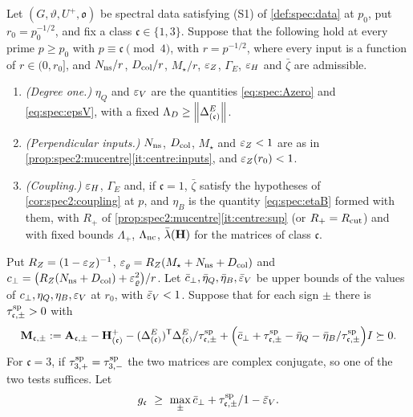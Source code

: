 \begin{theorem}\label{thm:spectral-criterion}
Let $(G,\vartheta,U^+,\mathfrak o)$ be spectral data satisfying
\textup{(S1)} of \cref{def:spec:data} at $p_0$,
put $r_0=p_0^{-1/2}$, and fix a class $\mathfrak c\in\{1,3\}$. Suppose that the
following hold at every prime $p\ge p_0$ with $p\equiv\mathfrak c\pmod4$, with
$r=p^{-1/2}$, where every input is a function of $r\in(0,r_0]$, and
$N_{\rm ns}/r$, $D_{\rm col}/r$, $M_\star/r$, $\varepsilon_Z$, $\Gamma_E$, $\varepsilon_H$ and $\bar\zeta$ are
admissible.
\begin{enumerate}[label=\textup{(R\arabic*)}]
\item \emph{(Degree one.)} $\eta_Q$ and $\varepsilon_V$ are the quantities \eqref{eq:spec:Azero}
  and \eqref{eq:spec:epsV}, with a fixed $\Lambda_D\ge\left\|\Delta^E_{(\mathfrak c)}\right\|$.
\item \emph{(Perpendicular inputs.)} $N_{\rm ns}$, $D_{\rm col}$, $M_\star$ and $\varepsilon_Z<1$ are
  as in \cref{prop:spec2:mucentre}\ref{it:centre:inputs}, and $\varepsilon_Z(r_0)<1$.
\item \emph{(Coupling.)} $\varepsilon_H$, $\Gamma_E$ and, if $\mathfrak c=1$, $\bar\zeta$ satisfy
  the hypotheses of \cref{cor:spec2:coupling} at $p$, and $\eta_B$ is the quantity
  \eqref{eq:spec:etaB} formed with them, with $R_+$ of
  \cref{prop:spec2:mucentre}\ref{it:centre:sup} (or $R_+=R_{\mathrm{cut}}$) and with fixed bounds
  $\Lambda_+$, $\Lambda_{\rm nc}$, $\bar\lambda(\mathbf H)$ for the matrices of class $\mathfrak c$.
\end{enumerate}
Put $R_Z=(1-\varepsilon_Z)^{-1}$, $\varepsilon_\varrho=R_Z(M_\star+N_{\rm ns}+D_{\rm col})$ and
$c_\perp=\big(R_Z(N_{\rm ns}+D_{\rm col})+\varepsilon_\varrho^2\big)/r$. Let
$\bar c_{\perp},\bar\eta_Q,\bar\eta_B,\bar{\varepsilon}_V$ be upper bounds of the values of
$c_\perp,\eta_Q,\eta_B,\varepsilon_V$ at $r_0$, with $\bar{\varepsilon}_V<1$. Suppose that for each sign
$\pm$ there is $\tau^{\rm sp}_{\mathfrak c,\pm}>0$ with
\begin{equation}\label{eq:spectral-test}
  \mathbf M_{\mathfrak c,\pm}:=\mathbf A_{\mathfrak c,\pm}
  -\mathbf H^+_{(\mathfrak c)}-(\Delta^E_{(\mathfrak c)})^{\mathsf T}\Delta^E_{(\mathfrak c)}/\tau^{\rm sp}_{\mathfrak c,\pm}
  +\Big(\bar c_{\perp}+\tau^{\rm sp}_{\mathfrak c,\pm}-\bar\eta_Q-\bar\eta_B/\tau^{\rm sp}_{\mathfrak c,\pm}\Big)I\succeq0 .
\end{equation}
For $\mathfrak c=3$, if $\tau^{\rm sp}_{3,+}=\tau^{\rm sp}_{3,-}$ the two matrices are complex
conjugate, so one of the two tests suffices. Let
\[
  g_{\mathfrak c}\ \ge\ \max_\pm\frac{\cperp+\tau^{\rm sp}_{\mathfrak c,\pm}}{1-\bar\eps_V}.
\]
\end{theorem}

